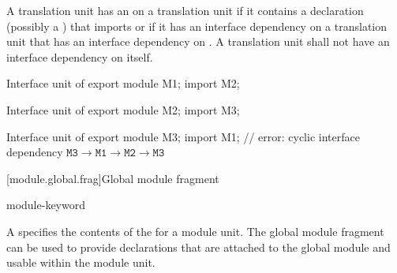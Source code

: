 \pnum
A translation unit has an  on a translation unit 
if it contains a declaration (possibly a )
that imports  or if it has
an interface dependency on a translation unit that has an interface dependency on .
A translation unit shall not have an interface dependency on itself.
\begin{example}
\begin{codeblocktu}{Interface unit of }
export module M1;
import M2;
\end{codeblocktu}

\begin{codeblocktu}{Interface unit of }
export module M2;
import M3;
\end{codeblocktu}

\begin{codeblocktu}{Interface unit of }
export module M3;
import M1;              // error: cyclic interface dependency $\mathtt{M3} \rightarrow \mathtt{M1} \rightarrow \mathtt{M2} \rightarrow \mathtt{M3}$
\end{codeblocktu}
\end{example}

[module.global.frag]{Global module fragment}

\begin{bnf}
\br
    module-keyword \terminal{;} 
\end{bnf}

\pnum
A  specifies the contents of the
 for a module unit.
The global module fragment can be used to provide declarations
that are attached to the global module and usable within the module unit.

